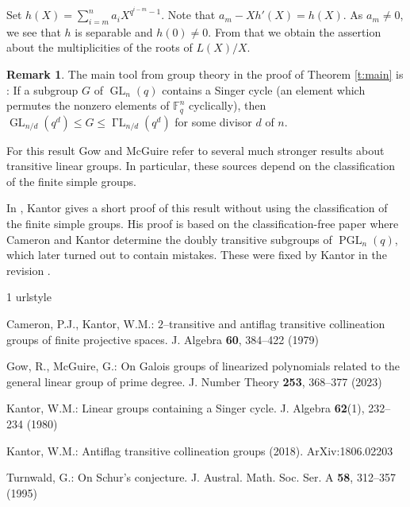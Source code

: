 \documentclass[12pt]{article}
\theoremstyle{plain}
\theoremstyle{definition}
\newtheorem{remark}[theorem]{Remark}
\newcommand{\FF}{\mathbb F}
\DeclareMathOperator{\gL}{\Gamma L}
\DeclareMathOperator{\GL}{GL}
\DeclareMathOperator{\PGL}{PGL}
\begin{document}
Set $h(X)=\sum_{i=m}^na_iX^{q^{i-m}-1}$. Note that
$a_m-Xh'(X)=h(X)$. As $a_m\ne0$, we see that $h$ is separable and
$h(0)\ne0$. From that we obtain the assertion about the multiplicities
of the roots of $L(X)/X$.
\begin{remark}\label{r:singer}
  The main tool from group theory in the proof of Theorem \ref{t:main}
  is \cite[Theorem 7]{gow_mcguire_glnq}: If a subgroup $G$ of
  $\GL_n(q)$ contains a Singer cycle (an element which permutes the
  nonzero elements of $\FF_q^n$ cyclically), then
  $\GL_{n/d}(q^d)\le G\le\gL_{n/d}(q^d)$ for some divisor $d$ of $n$.

  For this result Gow and McGuire refer to several much stronger results
  about transitive linear groups. In particular, these sources depend
  on the classification of the finite simple groups.

  In \cite{Kantor:Singer}, Kantor gives a short proof of this result
  without using the classification of the finite simple
  groups. His proof is based on the classification-free paper
  \cite{CamKan:2tranproj} where Cameron and Kantor determine the doubly
  transitive subgroups of $\PGL_n(q)$, which later turned out to
  contain mistakes. These were fixed by Kantor in the revision
  \cite{1806.02203}.
\end{remark}
%
%
\begin{thebibliography}{1}
\providecommand{\url}[1]{{#1}}
\providecommand{\urlprefix}{URL }
\expandafter\ifx\csname urlstyle\endcsname\relax
  \providecommand{\doi}[1]{DOI~\discretionary{}{}{}#1}\else
  \providecommand{\doi}{DOI~\discretionary{}{}{}\begingroup
  \urlstyle{rm}\Url}\fi

Cameron, P.J., Kantor, W.M.: $2$--transitive and antiflag transitive
  collineation groups of finite projective spaces.
\newblock J. Algebra \textbf{60}, 384--422 (1979)

Gow, R., McGuire, G.: On {G}alois groups of linearized polynomials related to
  the general linear group of prime degree.
\newblock J. Number Theory \textbf{253}, 368--377 (2023)

Kantor, W.M.: Linear groups containing a {S}inger cycle.
\newblock J. Algebra \textbf{62}(1), 232--234 (1980)

Kantor, W.M.: Antiflag transitive collineation groups (2018).
\newblock ArXiv:1806.02203

Turnwald, G.: On {S}chur's conjecture.
\newblock J. Austral. Math. Soc. Ser. A \textbf{58}, 312--357 (1995)

\end{thebibliography}
\end{document}
